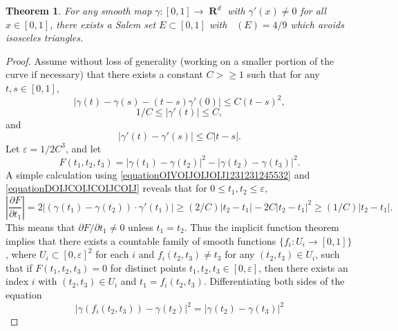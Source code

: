\documentclass[dvipsnames,letterpaper,12pt]{article}
\numberwithin{equation}{section}
\DeclareMathOperator{\fordim}{\dim_{\mathbf{F}}}
\DeclareMathOperator{\RR}{\mathbf{R}}
\newtheorem{theorem}{Theorem}
\numberwithin{theorem}{section}
\begin{document}
\begin{theorem}
    For any smooth map $\gamma: [0,1] \to \RR^d$ with $\gamma'(x) \neq 0$ for all $x \in [0,1]$, there exists a Salem set $E \subset [0,1]$ with $\fordim(E) = 4/9$ which avoids isosceles triangles.
\end{theorem}
\begin{proof}
    Assume without loss of generality (working on a smaller portion of the curve if necessary) that there exists a constant $C > \geq 1$ such that for any $t,s \in [0,1]$,
    \begin{equation} \label{equationOIVOIJOIJOIJ1231231245532}
        |\gamma(t) - \gamma(s) - (t - s)\gamma'(0)| \leq C (t - s)^2,
    \end{equation}
    \begin{equation} \label{equationDOIJCOIJCOIJCOIJ}
        1/C \leq |\gamma'(t)| \leq C,
    \end{equation}
    and
    \begin{equation} \label{equationCIOJAOIVJVOIJioj1312421541}
        |\gamma'(t) - \gamma'(s)| \leq C |t - s|.
    \end{equation}
    Let $\varepsilon = 1/2C^3$, and let
    \begin{equation}
        F(t_1,t_2,t_3) = |\gamma(t_1) - \gamma(t_2)|^2 - |\gamma(t_2) - \gamma(t_3)|^2.
    \end{equation}
    A simple calculation using \eqref{equationOIVOIJOIJOIJ1231231245532} and \eqref{equationDOIJCOIJCOIJCOIJ} reveals that for $0 \leq t_1,t_2 \leq \varepsilon$,
    \begin{equation} \label{equationCOIJAWOIJCAWOIJWOAI2112412}
        \left| \frac{\partial F}{\partial t_1} \right| = 2 \left| (\gamma(t_1) - \gamma(t_2)) \cdot \gamma'(t_1) \right| \geq (2/C) |t_2 - t_1| - 2C |t_2 - t_1|^2 \geq (1/C) |t_2 - t_1|.
    \end{equation}
    This means that $\partial F / \partial t_1 \neq 0$ unless $t_1 = t_2$. Thus the implicit function theorem implies that there exists a countable family of smooth functions $\{ f_i: U_i \to [0,1] \}$, where $U_i \subset [0,\varepsilon]^2$ for each $i$ and $f_i(t_2,t_3) \neq t_3$ for any $(t_2,t_3) \in U_i$, such that if $F(t_1,t_2,t_3) = 0$ for distinct points $t_1,t_2,t_3 \in [0,\varepsilon]$, then there exists an index $i$ with $(t_2,t_3) \in U_i$ and $t_1 = f_i(t_2,t_3)$. Differentiating both sides of the equation
    \begin{equation}
        |\gamma(f_i(t_2,t_3)) - \gamma(t_2)|^2 = |\gamma(t_2) - \gamma(t_3)|^2

\end{equation}
\end{proof}
\end{document}

